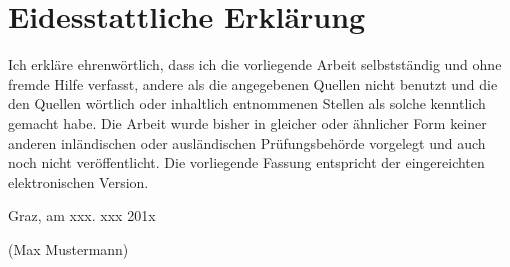 


\chapter*{Eidesstattliche  Erklärung}



Ich erkläre ehrenwörtlich, dass ich die vorliegende Arbeit selbstständig und
ohne fremde Hilfe verfasst, andere als die angegebenen Quellen nicht benutzt
und die den Quellen wörtlich oder inhaltlich entnommenen Stellen als
solche kenntlich gemacht habe. Die Arbeit wurde bisher in gleicher oder
ähnlicher Form keiner anderen inländischen oder ausländischen Prüfungsbehörde
vorgelegt und auch noch nicht veröffentlicht. Die vorliegende Fassung
entspricht der eingereichten elektronischen Version.

\vspace*{2cm}

\begin{minipage}[b]{0.4\textwidth}
\begin{flushleft}
Graz, am xxx. xxx 201x\newline
\phantom{Zeile}
\end{flushleft}
\end{minipage}
\hfill
\begin{minipage}[b]{0.4\textwidth}
\begin{center}
\vspace*{-1cm}

(Max Mustermann)
\end{center}
\end{minipage}



